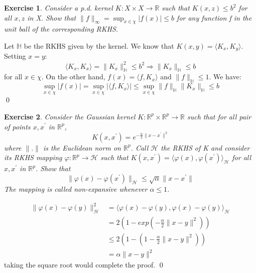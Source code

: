 \documentclass[12pt]{article}
\newtheorem{ex}{Exercise}
\begin{document}
	\begin{bx}
		
		\begin{ex}
		Consider a p.d. kernel $K:X\times X\rightarrow\mathbb{R}$ such that $K(x,z) \le b^2$ for all $x,z$ in
		X. Show that $\|f\|_\infty = \sup_{x\in \chi} |f(x)| \le b$ for any function f in the unit ball
		of the corresponding RKHS.
		\end{ex}
		\tcblower
		Let $\mathbb{H}$ be the RKHS given by the kernel. We know that $K(x,y) = \langle K_x,K_y \rangle$.
		Setting $x=y$:
		$$\langle K_x,K_x\rangle=\|K_x\|_\mathbb{H}^2\le b^2 \Rightarrow \|K_x\|_\mathbb{H}\le b $$ for all $x\in \chi$.
		On the other hand, $f(x)=\langle f,K_x\rangle$ and $\|f\|_\mathbb{H}\le 1$. We have:
		\[
		\sup_{x\in \chi} |f(x)| = \sup_{x\in \chi}|\langle f,K_x\rangle| \le \sup_{x\in\chi} \|f\|_\mathbb{H}\|K_x\|_\mathbb{H} \le b
		\]
		\qed
	\end{bx}
	
	\begin{bx}
		
		\begin{ex}
		Consider the Gaussian kernel $K: \mathbb{R}^p \times \mathbb{R}^p \rightarrow \mathbb{R}$ such that for all pair of points $x,x^\prime$ in $\mathbb{R}^p$,
		\[
		K(x,x^\prime) = e^{-\frac{\alpha}{2}\|x-x^\prime\|^2}
		\]
		where $\|.\|$ is the Euclidean norm on $\mathbb{R}^p$. Call $\mathcal{H}$ the RKHS of K and consider its RKHS mapping $\varphi:\mathbb{R}^p \rightarrow \mathcal{H}$ such that $K(x,x^\prime)=\langle\varphi(x),\varphi(x^\prime) \rangle_\mathcal{H}$ for all $x,x^\prime$ in $\mathbb{R}^p$. Show that 
		\[
		\|\varphi(x)-\varphi(x^\prime)\|_\mathcal{H} \le \sqrt{\alpha}\|x-x^\prime\|
		\]
		The mapping is called non-expansive whenever $\alpha\le 1$.
		\end{ex}
		\tcblower
	\begin{align*}
	\|\varphi(x)-\varphi(y)\|_\mathcal{H}^2 &= \langle \varphi(x)-\varphi(y),\varphi(x)-\varphi(y)\rangle_\mathcal{H} \\
	&= 2(1-exp(-\frac{\alpha}{2}\|x-y\|^2)) \\
	&\le 2(1-(1-\frac{\alpha}{2}\|x-y\|^2)) \\
	&= \alpha\|x-y\|^2
	\end{align*}
taking the square root would complete the proof.
		\qed
	\end{bx}
	
\end{document}
